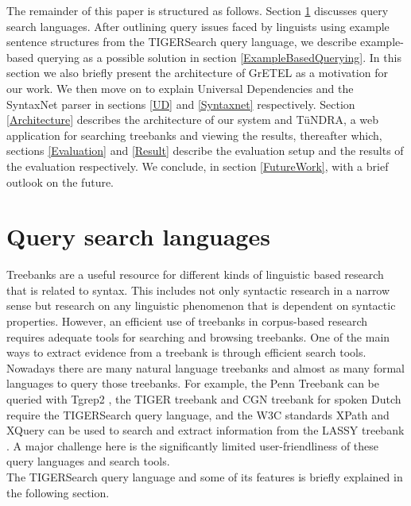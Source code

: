 \documentclass[]{scrartcl}
\theoremstyle{exmp}
\begin{document}
The remainder of this paper is structured as follows. Section \ref{QuerySearchLanguages} discusses query search languages. After outlining query issues faced by linguists using example sentence structures from the TIGERSearch query language, we describe example-based querying as a possible solution in section \ref{ExampleBasedQuerying}. In this section we also briefly present the architecture of GrETEL as a motivation for our work. We then move on to explain Universal Dependencies and the SyntaxNet parser in sections \ref{UD} and \ref{Syntaxnet} respectively. Section \ref{Architecture} describes the architecture of our system and T\"uNDRA, a web application for searching treebanks and viewing the results, thereafter which, sections \ref{Evaluation} and \ref{Result} describe the evaluation setup and the results of the evaluation respectively. We conclude, in section \ref{FutureWork}, with a brief outlook on the future.


\section{Query search languages}\label{QuerySearchLanguages}
Treebanks are a useful resource for different kinds of linguistic based research that is related to syntax. This includes not only syntactic research in a narrow sense but research on any linguistic phenomenon that is dependent on syntactic properties. However, an efficient use of treebanks in corpus-based research requires adequate tools for searching and browsing treebanks. One of the main ways to extract evidence from a treebank is through efficient search tools. \\
Nowadays there are many natural language treebanks and almost as many formal languages to query those treebanks. For example, the Penn Treebank can be queried with Tgrep2 \cite{Tgrep2}, the TIGER treebank \cite{TIGERtreebank} and CGN treebank for spoken Dutch \cite{CGN} require the TIGERSearch query language, and the W3C standards XPath and XQuery can be used to search and extract information from the LASSY treebank \cite{LASSY}. A major challenge here is the significantly limited user-friendliness of these query languages and search tools. \\
The TIGERSearch query language and some of its features is briefly explained in the following section. 
\end{document}
